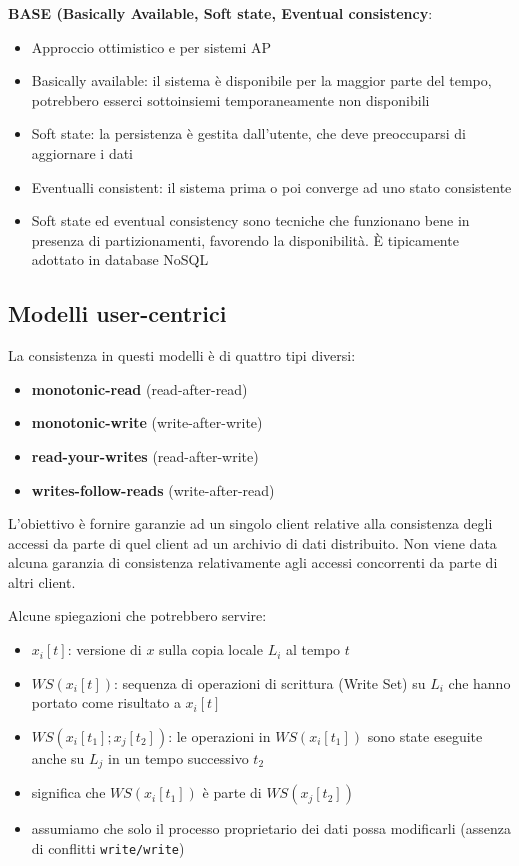 \textbf{BASE (Basically Available, Soft state, Eventual consistency}:
\begin{itemize}
    \item Approccio ottimistico e per sistemi AP
    \item Basically available: il sistema è disponibile per la maggior parte del tempo, potrebbero esserci sottoinsiemi temporaneamente non disponibili
    \item Soft state: la persistenza è gestita dall'utente, che deve preoccuparsi di aggiornare i dati
    \item Eventualli consistent: il sistema prima o poi converge ad uno stato consistente
    \item Soft state ed eventual consistency sono tecniche che funzionano bene in presenza di partizionamenti, favorendo la disponibilità. È tipicamente adottato in database NoSQL
\end{itemize}

\subsection{Modelli user-centrici}
La consistenza in questi modelli è di quattro tipi diversi:
\begin{itemize}
    \item \textbf{monotonic-read} (read-after-read)
    \item \textbf{monotonic-write} (write-after-write)
    \item \textbf{read-your-writes} (read-after-write)
    \item \textbf{writes-follow-reads} (write-after-read)
\end{itemize}

L'obiettivo è fornire garanzie ad un singolo client relative alla consistenza degli accessi da parte di quel client ad un archivio di dati distribuito. Non viene data alcuna garanzia di consistenza relativamente agli accessi concorrenti da parte di altri client.

Alcune spiegazioni che potrebbero servire:
\begin{itemize}
    \item $x_{i}[t]$: versione di $x$ sulla copia locale $L_{i}$ al tempo $t$
    \item $WS(x_{i}[t])$: sequenza di operazioni di scrittura (Write Set) su $L_{i}$ che hanno portato come risultato a $x_{i}[t]$
    \item $WS(x_{i}[t_{1}]; x_{j}[t_{2}])$: le operazioni in $WS(x_{i}[t_{1}])$ sono state eseguite anche su $L_{j}$ in un tempo successivo $t_{2}$
    \item significa che $WS(x_{i}[t_{1}])$ è parte di $WS(x_{j}[t_{2}])$
    \item assumiamo che solo il processo proprietario dei dati possa modificarli (assenza di conflitti \texttt{write/write})
\end{itemize}

